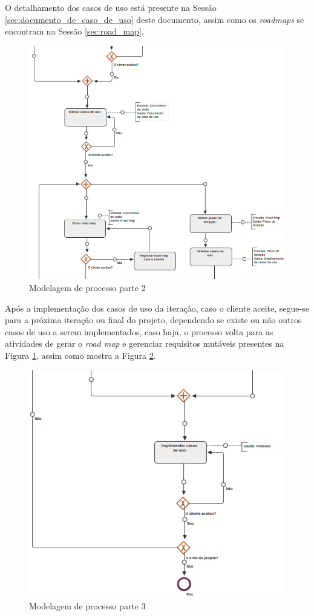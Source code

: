 O detalhamento dos casos de uso está presente na Sessão \ref{sec:documento_de_caso_de_uso} deste documento, assim como os \textit{roadmaps} se encontram na Sessão \ref{sec:road_map}.

\begin{figure}[H]
	\centering
	\includegraphics[width=1\textwidth]{imgModelagem/modelagem2}
	\caption{Modelagem de processo parte 2}
	\label{img:modelagem2}
\end{figure}

Após a implementação dos casos de uso da iteração, caso o cliente aceite, segue-se para a próxima iteração ou final do projeto, dependendo se existe ou não outros casos de uso a serem implementados, caso haja, o processo volta para as atividades de gerar o \textit{road map}  e gerenciar requisitos mutáveis presentes na Figura \ref{img:modelagem2}, assim como mostra a Figura \ref{img:modelagem3}.

\begin{figure}[H]
	\centering
	\includegraphics[width=1\textwidth]{imgModelagem/modelagem3}
	\caption{Modelagem de processo parte 3}
	\label{img:modelagem3}
\end{figure}
